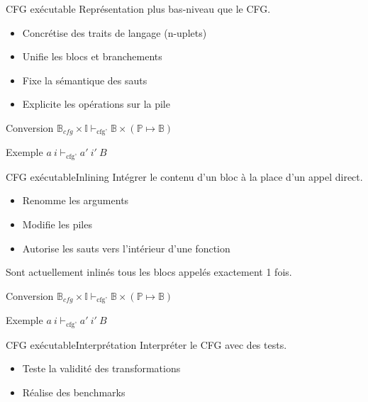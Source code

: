 \documentclass{beamer}
\begin{document}
\begin{frame}{CFG exécutable}
    Représentation plus bas-niveau que le CFG.

    \begin{itemize}
        \item Concrétise des traits de langage (n-uplets)
        \item Unifie les blocs et branchements
        \item Fixe la sémantique des sauts
        \item Explicite les opérations sur la pile
    \end{itemize}

    \begin{block}{Conversion}
        $\mathbb{B}_{cfg} \times \mathbb{I} \vdash_{\text{cfg'}} \mathbb{B} \times (\mathbb{P} \mapsto \mathbb{B})$
    \end{block}

    \begin{exampleblock}{Exemple}
        $a ~ i \vdash_{\text{cfg'}} a' ~ i' ~ B$
    \end{exampleblock}
\end{frame}

\begin{frame}{CFG exécutable}{Inlining}
    Intégrer le contenu d'un bloc à la place d'un appel direct.

    \begin{itemize}
        \item Renomme les arguments
        \item Modifie les piles
        \item Autorise les sauts vers l'intérieur d'une fonction
    \end{itemize}

    Sont actuellement inlinés tous les blocs appelés exactement 1 fois.

    \begin{block}{Conversion}
        $\mathbb{B}_{cfg} \times \mathbb{I} \vdash_{\text{cfg'}} \mathbb{B} \times (\mathbb{P} \mapsto \mathbb{B})$
    \end{block}

    \begin{exampleblock}{Exemple}
        $a ~ i \vdash_{\text{cfg'}} a' ~ i' ~ B$
    \end{exampleblock}
\end{frame}

\begin{frame}{CFG exécutable}{Interprétation}
    Interpréter le CFG avec des tests.

    \begin{itemize}
        \item Teste la validité des transformations
        \item Réalise des benchmarks
    \end{itemize}
\end{frame}
\end{document}
